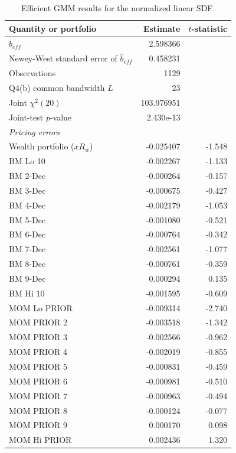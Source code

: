 \begin{table}[htbp]
\centering
\small
\caption{Efficient GMM results for the normalized linear SDF.}
\label{tab:q4c-results}
\begin{tabular}{lrr}
\hline
Quantity or portfolio & Estimate & $t$-statistic \\
\hline
$\widehat{b}_{eff}$ & 2.598366 & \\
Newey-West standard error of $\widehat{b}_{eff}$ & 0.458231 & \\
Observations & 1129 & \\
Q4(b) common bandwidth $L$ & 23 & \\
Joint $\chi^2(20)$ & 103.976951 & \\
Joint-test $p$-value & 2.430e-13 & \\
\hline
\multicolumn{3}{l}{\textit{Pricing errors}} \\
\hline
Wealth portfolio ($xR_w$) & -0.025407 & -1.548 \\
BM Lo 10 & -0.002267 & -1.133 \\
BM 2-Dec & -0.000264 & -0.157 \\
BM 3-Dec & -0.000675 & -0.427 \\
BM 4-Dec & -0.002179 & -1.053 \\
BM 5-Dec & -0.001080 & -0.521 \\
BM 6-Dec & -0.000764 & -0.342 \\
BM 7-Dec & -0.002561 & -1.077 \\
BM 8-Dec & -0.000761 & -0.359 \\
BM 9-Dec & 0.000294 & 0.135 \\
BM Hi 10 & -0.001595 & -0.609 \\
MOM Lo PRIOR & -0.009314 & -2.740 \\
MOM PRIOR 2 & -0.003518 & -1.342 \\
MOM PRIOR 3 & -0.002566 & -0.962 \\
MOM PRIOR 4 & -0.002019 & -0.855 \\
MOM PRIOR 5 & -0.000831 & -0.459 \\
MOM PRIOR 6 & -0.000981 & -0.510 \\
MOM PRIOR 7 & -0.000963 & -0.494 \\
MOM PRIOR 8 & -0.000124 & -0.077 \\
MOM PRIOR 9 & 0.000170 & 0.098 \\
MOM Hi PRIOR & 0.002436 & 1.320 \\
\hline
\end{tabular}
\end{table}

